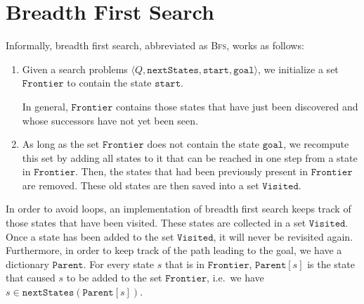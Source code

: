 \section{Breadth First Search}
Informally, breadth first search, abbreviated as \textsc{Bfs}, works as follows:
\begin{enumerate}
\item Given a search problems $\langle Q,\mathtt{nextStates}, \mathtt{start}, \mathtt{goal}\rangle$,  
      we initialize a set $\mathtt{Frontier}$ to contain the state $\mathtt{start}$.

      In general, $\mathtt{Frontier}$ contains those states that have just been discovered and whose successors have not
      yet been seen.
\item As long as the set $\mathtt{Frontier}$ does not contain the state $\mathtt{goal}$, we recompute this set 
      by adding all states to it that can be reached in one step from a state in $\mathtt{Frontier}$.
      Then, the states that had been previously present in $\mathtt{Frontier}$ are removed.
      These old states are then saved into a set $\mathtt{Visited}$.
\end{enumerate}
In order to avoid loops, an implementation of breadth first search keeps track of those states that have
been visited.  These states are collected in a set $\mathtt{Visited}$.  Once a state has been added to
the set $\mathtt{Visited}$,  it will never be revisited again. 
Furthermore, in order to keep track of the path leading to the goal, we have a dictionary
$\mathtt{Parent}$.  For every state $s$ that is in $\mathtt{Frontier}$, $\mathtt{Parent}[s]$ is the state that
caused $s$ to be added to the set $\mathtt{Frontier}$, i.e.~we have
\\[0.2cm]
\hspace*{1.3cm}
$s \in \mathtt{nextStates}(\mathtt{Parent}[s])$.


